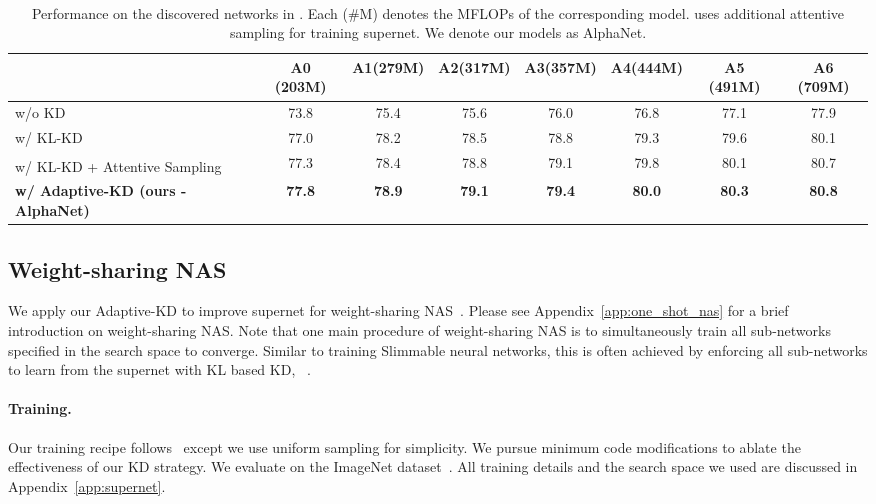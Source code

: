 \documentclass{article}
\begin{document}
\begin{table*}[ht]
    \centering
    \setlength{\tabcolsep}{3pt}
    \begin{tabular}{l|ccccccc}
    \hline 
     & A0 {\scriptsize (203M)}   & A1{\scriptsize (279M)}  & A2{\scriptsize (317M)}  & A3{\scriptsize (357M)} & A4{\scriptsize (444M)}  & A5 {\scriptsize (491M)} & A6 {\scriptsize (709M)}   \\ \hline 
    w/o KD & 73.8 & 75.4 & 75.6 & 76.0 & 76.8 &77.1 &  77.9  \\
    w/ KL-KD & 77.0 & 78.2 & 78.5 &78.8 &79.3 &79.6 & 80.1 \\
    w/ KL-KD + Attentive Sampling \textsuperscript{} & 77.3 & 78.4 & 78.8 & 79.1 & 79.8 & 80.1 & 80.7 \\ \hline 
    \bf  w/ Adaptive-KD (ours - AlphaNet) &   \bf77.8 & \bf 78.9  & \bf79.1 & \bf 79.4 &\bf 80.0 & \bf 80.3 & \bf 80.8  \\
    \hline  
    \end{tabular}
    \caption{
    Performance on the discovered networks in \citet{wang2020attentivenas}. 
    Each (\#M) denotes the MFLOPs of the corresponding model. 
    \textsuperscript{} uses additional attentive sampling \citep{wang2020attentivenas} for training supernet.
    We denote our models as AlphaNet. 
    }
    \label{tab:attnas}
\end{table*}

\subsection{Weight-sharing NAS}
\label{sec:exp_supernet}
We apply our Adaptive-KD to improve supernet for weight-sharing NAS~\citep{cai2019once, yu2020bignas, wang2020attentivenas}. Please see Appendix~\ref{app:one_shot_nas} for a brief introduction on weight-sharing NAS. 
Note that one main procedure of weight-sharing NAS is to simultaneously train all sub-networks specified in the search space to converge. 
Similar to training Slimmable neural networks, 
this is often achieved by enforcing all sub-networks to learn from the supernet with KL based KD, ~\citep[e.g.,][]{yu2020bignas}. 

\paragraph{Training.} 
Our training recipe follows~\citet{wang2020attentivenas} except we use uniform sampling for simplicity. We pursue minimum code modifications to ablate the effectiveness of our KD strategy. 
We evaluate on the ImageNet dataset~\citep{deng2009imagenet}. 
All training details and the search space we used are discussed in Appendix~\ref{app:supernet}.
\end{document}

